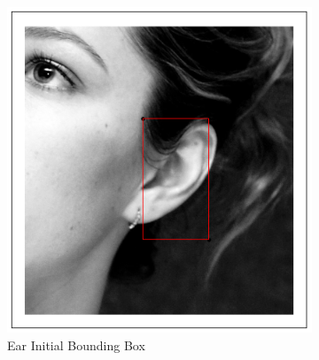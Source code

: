 \begin{figure}[h]
    \centering
    \begin{subfigure}[b]{0.1\textwidth}
            \includegraphics[width=\textwidth]{supports/Segmentation_Measure/ear}
        \caption{Ear Initial Bounding Box}
    \end{subfigure}
    \qquad
    \begin{subfigure}[b]{0.1\textwidth}

\end{subfigure}
\end{figure}
